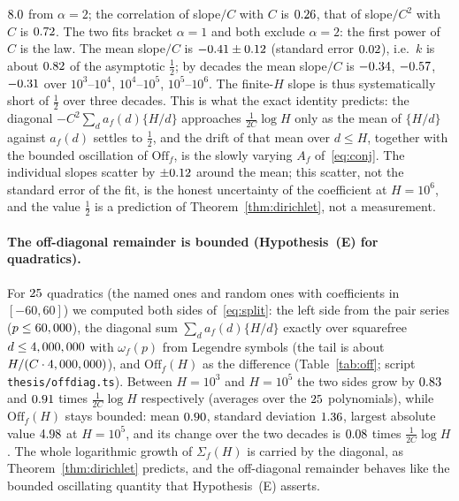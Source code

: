 \documentclass[11pt,a4paper]{article}
\theoremstyle{remark}\newtheorem{remark}[theorem]{Remark}
\begin{document}
$8.0$ from $\alpha=2$; the correlation of slope$/C$ with $C$ is $0.26$, that of
slope$/C^2$ with $C$ is $0.72$. The two fits bracket $\alpha=1$ and both exclude $\alpha=2$: the
first power of $C$ is the law. The mean slope$/C$ is $-0.41\pm0.12$
(standard error $0.02$), i.e.\ $k$ is about $0.82$ of the asymptotic $\tfrac12$; by decades
the mean slope$/C$ is $-0.34$, $-0.57$, $-0.31$ over $10^3$--$10^4$, $10^4$--$10^5$,
$10^5$--$10^6$. The finite-$H$ slope is thus systematically short of $\tfrac12$ over three decades. This
is what the exact identity predicts: the diagonal $-C^2\sum_da_f(d)\{H/d\}$ approaches
$\frac1{2C}\log H$ only as the mean of $\{H/d\}$ against $a_f(d)$ settles to $\tfrac12$, and the drift of
that mean over $d\le H$, together with the bounded oscillation of $\mathrm{Off}_f$, is the slowly varying
$A_f$ of~\eqref{eq:conj}. The individual slopes scatter by $\pm0.12$ around the mean; this
scatter, not the standard error of the fit, is the honest uncertainty of the coefficient at $H=10^6$,
and the value $\tfrac12$ is a prediction of Theorem~\ref{thm:dirichlet}, not a measurement.

\paragraph{The off-diagonal remainder is bounded (Hypothesis~(E) for quadratics).} For $25$
quadratics (the named ones and random ones with coefficients in $[-60,60]$) we computed both sides
of~\eqref{eq:split}: the left side from the pair series ($p\le60,000$), the diagonal sum
$\sum_da_f(d)\{H/d\}$ exactly over squarefree $d\le4,000,000$ with $\omega_f(p)$ from Legendre symbols
(the tail is about $H/(C\cdot4,000,000)$), and $\mathrm{Off}_f(H)$ as the difference
(Table~\ref{tab:off}; script \texttt{thesis/offdiag.ts}). Between $H=10^3$ and $H=10^5$ the two sides grow
by $0.83$ and $0.91$ times $\frac1{2C}\log H$ respectively (averages over the
$25$ polynomials), while $\mathrm{Off}_f(H)$ stays bounded: mean $0.90$, standard deviation
$1.36$, largest absolute value $4.98$ at $H=10^5$, and its change over the two decades is
$0.08$ times $\frac1{2C}\log H$. The whole logarithmic growth of $\Sigma_f(H)$ is carried by
the diagonal, as Theorem~\ref{thm:dirichlet} predicts, and the off-diagonal remainder behaves like the
bounded oscillating quantity that Hypothesis~(E) asserts.
\end{document}
